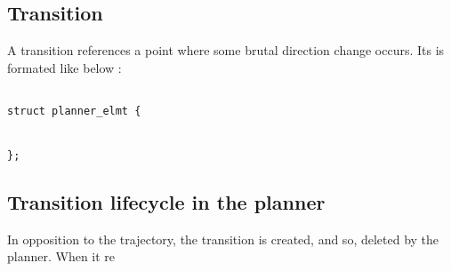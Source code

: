\subsection{Transition}

A transition references a point where some brutal direction change occurs. Its is formated like below : 

\begin{lstlisting}[style=CStyle]

struct planner_elmt {


};

\end{lstlisting}



\subsection{Transition lifecycle in the planner}

In opposition to the trajectory, the transition is created, and so, deleted by the planner.
When it re




